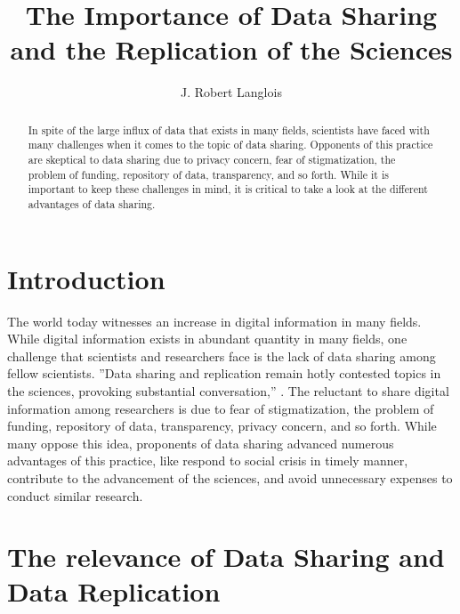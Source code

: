 \documentclass[sigconf]{acmart}
\begin{document}
\title{The Importance of Data Sharing and the Replication of the Sciences}




\author{J. Robert Langlois}




\begin{abstract}


In spite of the large influx of data that exists in many fields, scientists have faced with many challenges when it comes to the topic of data sharing. Opponents of this practice are skeptical to data sharing due to privacy concern, fear of stigmatization, the problem of funding, repository of data, transparency, and so forth. While it is important to keep these challenges in mind, it is critical to take a look at the different advantages of data sharing. 

\end{abstract}



\maketitle

\section{Introduction}

The world today witnesses an increase in digital information in many fields. While digital information exists in abundant quantity in many fields, one challenge that scientists and researchers face is the lack of data sharing among fellow scientists. ''Data sharing and replication remain hotly contested topics in the sciences, provoking substantial conversation,'' \cite{leetaru2016}. The reluctant to share digital information among researchers is due to fear of stigmatization, the problem of funding, repository of data, transparency, privacy concern, and so forth. While many oppose this idea, proponents of data sharing advanced numerous advantages of this practice, like respond to social crisis in timely manner, contribute to the advancement of the sciences, and avoid unnecessary expenses to conduct similar research. 


\section{The relevance of Data Sharing and Data Replication 
}
\end{document}
